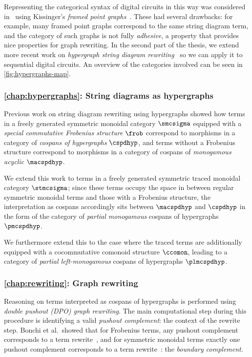 Representing the categorical syntax of digital circuits in this way was
considered in~\cite{ghica2017diagrammatic} using
Kissinger's \emph{framed point graphs}~\cite{kissinger2012pictures}.
These had several drawbacks: for example, many framed point graphs correspond to
the same string diagram term, and the category of such graphs is not fully
\emph{adhesive}, a property that provides nice properties for graph rewriting.
In the second part of the thesis, we extend more recent work on
\emph{hypergraph string diagram rewriting}~\cite{bonchi2022string,bonchi2022stringa,bonchi2022stringb}
so we can apply it to sequential digital circuits.
An overview of the categories involved can be seen in
\cref{fig:hypergraphs-map}.

\subsubsection{\cref{chap:hypergraphs}: String diagrams as hypergraphs}

Previous work on string diagram rewriting using hypergraphs showed how terms
in a freely generated symmetric monoidal category \(\smcsigma\) equipped with a
\emph{special commutative Frobenius structure} \(\frob\) correspond to morphisms
in a category of \emph{cospans of hypergraphs} \(\cspdhyp\), and terms without a
Frobenius structure correspond to morphisms in a category of
cospans of \emph{monogamous acyclic} \(\macspdhyp\).

We extend this work to terms in a freely generated symmetric traced monoidal
category \(\stmcsigma\); since these terms occupy the space in between regular
symmetric monoidal terms and those with a Frobenius structure, the
interpretation as cospans accordingly sits between \(\macspdhyp\) and
\(\cspdhyp\) in the form of the category of \emph{partial monogamous} cospans of
hypergraphs \(\pmcspdhyp\).

We furthermore extend this to the case where the traced terms are additionally
equipped with a cocommutative comonoid structure \(\ccomon\), leading to a
category of \emph{partial left-monogamous} cospans of hypergraphs
\(\plmcspdhyp\).

\subsubsection{\cref{chap:rewriting}: Graph rewriting}

Reasoning on terms interpreted as cospans of hypergraphs is performed using
\emph{double pushout (DPO) graph rewriting}.
The main computational step during this procedure is identifying a valid
\emph{pushout complement}: the context of the rewrite step.
Bonchi et al.\ showed that for Frobenius terms, any pushout complement
corresponds to a term rewrite~\cite{bonchi2022string}, and for symmetric
monoidal terms exactly one pushout complement corresponds to a term
rewrite~\cite{bonchi2022stringa}: the \emph{boundary complement}.

